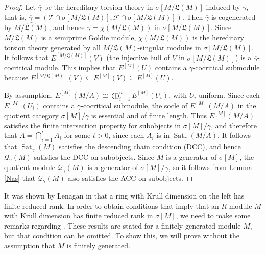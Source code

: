 \documentclass{amsart}
\theoremstyle{definition}
\theoremstyle{remark}
\numberwithin{equation}{section}
\DeclareMathOperator{\Sat}{Sat}
\newcommand{\sm}{\sigma[M]}
\begin{document}
\begin{proof}
		Let $\overline{\gamma}$ be the hereditary torsion theory 
		in $\sigma[M/\mathfrak{L}(M)]$ induced by $\gamma$, that is, 
		$\overline{\gamma}=\left( \mathcal{T}\cap\sigma[M/\mathfrak{L}(M)],
		\mathcal{F}\cap\sigma[M/\mathfrak{L}(M)]\right) $. 
		Then $\overline{\gamma}$ is cogenerated by $\widehat{M/\mathfrak{L}(M)}$,
		and hence $\overline{\gamma}=\chi(M/\mathfrak{L}(M))$ 
		in $\sigma[M/\mathfrak{L}(M)]$. 
		Since $M/\mathfrak{L}(M)$ is a semiprime Goldie module, 
		$\chi(M/\mathfrak{L}(M))$ is the hereditary torsion theory 
		generated by all $M/\mathfrak{L}(M)$-singular modules 
		in $\sigma[M/\mathfrak{L}(M)]$. 
		It follows that $E^{[M/\mathfrak{L}(M)]}(V)$ 
		(the injective hull of $V$ in $\sigma[M/\mathfrak{L}(M)]$) 
		is a $\overline{\gamma}$-cocritical module. 
		This implies that $E^{[M]}(U)$ 
		contains a $\gamma$-cocritical submodule 
		because $E^{[M/\mathfrak{L}(M)]}(V)\subseteq E^{[M]}(V) \subseteq E^{[M]}(U)$. 
		
		By assumption, $E^{[M]}(M/A)\cong\bigoplus_{i=1}^n E^{[M]}(U_i)$,
		with $U_i$ uniform. 
		Since each $E^{[M]}(U_i)$ contains a $\gamma$-cocritical submodule, 
		the socle of $E^{[M]}(M/A)$ in the quotient category $\sm/\gamma$ 
		is essential and of finite length. 
		Thus $E^{[M]}(M/A)$ satisfies the finite intersection property 
		for subobjects in $\sm/\gamma$, 
		and therefore that $A=\bigcap_{i=1}^t A_i$ for some $t>0$,
		since each $A_i$ is in $\Sat_\gamma(M/A)$. 
		It follows that $\Sat_\gamma(M)$ 
		satisfies the descending chain condition (DCC), 
		and hence $\mathcal{Q}_\gamma(M)$ satisfies the DCC on subobjects. 
		Since $M$ is a generator of $\sm$, the quotient module
		$\mathcal{Q}_\gamma(M)$ is a generator of $\sm/\gamma$, 
		so it follows from Lemma \ref{Nas} 
		that $\mathcal{Q}_\gamma(M)$ also satisfies the ACC on subobjects.
	\end{proof}
	
	
	
	It was shown by Lenagan in \cite{lenagan}
	that a ring with Krull dimension on the left has finite reduced rank.
	In order to obtain conditions that imply that an $R$-module $M$ 
	with Krull dimension has finite reduced rank in $\sm$, 
	we need to make some remarks regarding 
	\cite[Lemma 2.14 and Theorem 2.16]{Pepenil}. 
	These results are stated for a finitely generated module $M$, 
	but that condition can be omitted. 
	To show this, we will prove \cite[Lemma 2.14]{Pepenil} 
	without the assumption that $M$ is finitely generated.
	
\end{document}
